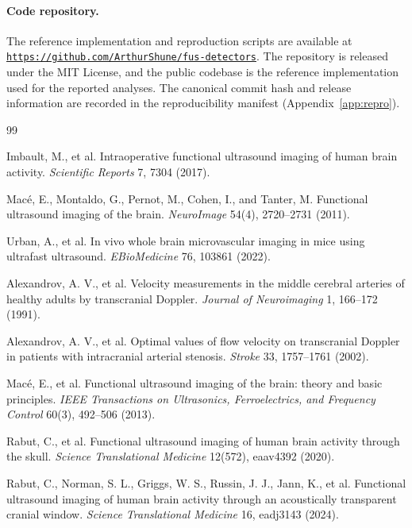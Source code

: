 \documentclass[11pt]{article}
\newif\ifPAPERONLY
\newcommand{\SuppOrApp}[1]{\ifPAPERONLY Supplementary Material\else Appendix~\ref{#1}\fi}
\begin{document}
\paragraph{Code repository.}
The reference implementation and reproduction scripts are available at \href{https://github.com/ArthurShune/fus-detectors}{\texttt{https://github.com/ArthurShune/fus-detectors}}. The repository is released under the MIT License, and the public codebase is the reference implementation used for the reported analyses. The canonical commit hash and release information are recorded in the reproducibility manifest (\SuppOrApp{app:repro}).
\fi

\fi %
\FloatBarrier
\begin{thebibliography}{99}
\raggedright

Imbault, M., et al.
\newblock Intraoperative functional ultrasound imaging of human brain activity.
\newblock \emph{Scientific Reports} 7, 7304 (2017).

Mac{\'e}, E., Montaldo, G., Pernot, M., Cohen, I., and Tanter, M.
\newblock Functional ultrasound imaging of the brain.
\newblock \emph{NeuroImage} 54(4), 2720--2731 (2011).

Urban, A., et al.
\newblock In vivo whole brain microvascular imaging in mice using ultrafast ultrasound.
\newblock \emph{EBioMedicine} 76, 103861 (2022).

Alexandrov, A. V., et al.
\newblock Velocity measurements in the middle cerebral arteries of healthy adults by transcranial Doppler.
\newblock \emph{Journal of Neuroimaging} 1, 166--172 (1991).

Alexandrov, A. V., et al.
\newblock Optimal values of flow velocity on transcranial Doppler in patients with intracranial arterial stenosis.
\newblock \emph{Stroke} 33, 1757--1761 (2002).

Mac{\'e}, E., et al.
\newblock Functional ultrasound imaging of the brain: theory and basic principles.
\newblock \emph{IEEE Transactions on Ultrasonics, Ferroelectrics, and Frequency Control} 60(3), 492--506 (2013).

Rabut, C., et al.
\newblock Functional ultrasound imaging of human brain activity through the skull.
\newblock \emph{Science Translational Medicine} 12(572), eaav4392 (2020).

Rabut, C., Norman, S. L., Griggs, W. S., Russin, J. J., Jann, K., et al.
\newblock Functional ultrasound imaging of human brain activity through an acoustically transparent cranial window.
\newblock \emph{Science Translational Medicine} 16, eadj3143 (2024).


\end{thebibliography}
\end{document}
